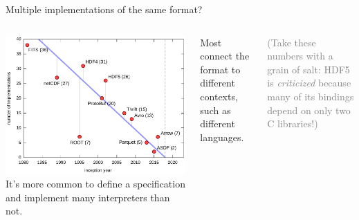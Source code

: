 \documentclass[aspectratio=169]{beamer}
\begin{document}
\begin{frame}{Multiple implementations of the same format?}
\vspace{0.25 cm}
\begin{columns}
\includegraphics[width=\linewidth]{formats.pdf}
It's more common to define a specification and implement many interpreters than not.

\vspace{0.25 cm}
Most connect the format to different contexts, such as different languages.

\vspace{0.25 cm}
\small\textcolor{gray}{(Take these numbers with a grain of salt: HDF5 is {\it criticized} because many of its bindings depend on only two C libraries!)}
\end{columns}
\end{frame}
\end{document}
